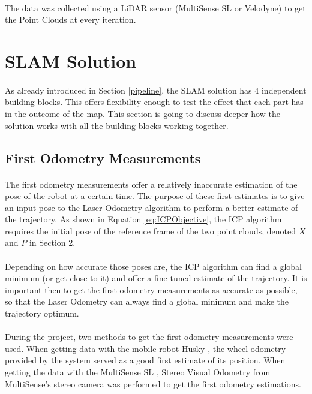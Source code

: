\documentclass[11pt]{article}
\begin{document}
	\paragraph{}
	The data was collected using a LiDAR sensor (MultiSense SL or Velodyne) to get the Point Clouds at every iteration.
	\newpage
	\section{SLAM Solution}
	\paragraph{}
	As already introduced in Section \ref{pipeline}, the SLAM solution has 4 independent building blocks. This offers flexibility enough to test the effect that each part has in the outcome of the map. This section is going to discuss deeper how the solution works with all the building blocks working together. 
	 
	\subsection{First Odometry Measurements}
	\paragraph{}
	The first odometry measurements offer a relatively inaccurate estimation of the pose of the robot at a certain time. The purpose of these first estimates is to give an input pose to the Laser Odometry algorithm to perform a better estimate of the trajectory. As shown in Equation \ref{eq:ICPObjective}, the ICP algorithm requires the initial pose of the reference frame of the two point clouds, denoted $X$ and $P$ in Section 2.

	\paragraph{}	
	Depending on how accurate those poses are, the ICP algorithm can find a global minimum (or get close to it) and offer a fine-tuned estimate of the trajectory. It is important then to get the first odometry measurements as accurate as possible, so that the Laser Odometry can always find a global minimum and make the trajectory optimum.
	
	\paragraph{}
	During the project, two methods to get the first odometry measurements were used. When getting data with the mobile robot Husky \cite{Husky}, the wheel odometry provided by the system served as a good first estimate of its position. When getting the data with the MultiSense SL \cite{multisense}, Stereo Visual Odometry from MultiSense's stereo camera was performed to get the first odometry estimations.
	
\end{document}
